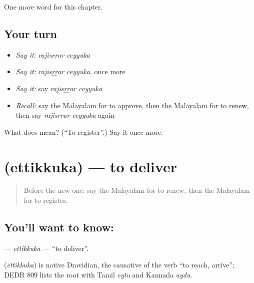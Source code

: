 \begin{grammarlens}[title={What you've built}]
One more word for this chapter.
\end{grammarlens}

\subsection*{Your turn}
\begin{itemize}
\raggedright
  \item \emph{Say it:} \emph{rajisṟṟar ceyyuka}
  \item \emph{Say it:} \emph{rajisṟṟar ceyyuka}, once more
  \item \emph{Say it:} say \emph{rajisṟṟar ceyyuka}
  \item \emph{Recall:} say the Malayalam for to approve, then the Malayalam for to renew, then say \emph{rajisṟṟar ceyyuka} again
\end{itemize}

\begin{tcolorbox}[breakable,colback=teal!4,colframe=teal!35!black,title={Before you move on}]
What does   mean? (\textquotedblleft{}To register\textquotedblright{}.) Say it once more.
\end{tcolorbox}
\section[\texorpdfstring{\ml{എത്തിക്കുക} (ettikkuka)}{എത്തിക്കുക (ettikkuka)}]{ (ettikkuka) — to deliver}

\label{lesson:ML-C268-ettikkuka}



\begin{quote}
Before the new one: say the Malayalam for to renew, then the Malayalam for to register.
\end{quote}

\subsection*{You'll want to know: }
\textbf{} — \emph{ettikkuka} — \textquotedblleft{}to deliver\textquotedblright{}.

\begin{cousinweb}
\textbf{} (\emph{ettikkuka}) is native Dravidian, the causative of the verb \textquotedblleft{}to reach, arrive\textquotedblright{}; DEDR 809 lists the root with Tamil \emph{eytu} and Kannada \emph{aydu}.
\end{cousinweb}

